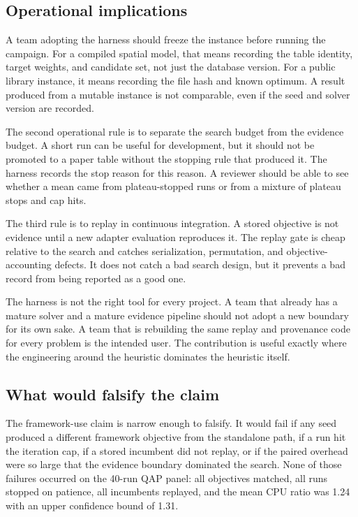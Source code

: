 \documentclass[pdflatex,sn-mathphys-num]{sn-jnl}
\begin{document}
\subsection{Operational implications}

A team adopting the harness should freeze the instance before running the campaign. For a compiled
spatial model, that means recording the table identity, target weights, and candidate set, not just
the database version. For a public library instance, it means recording the file hash and known
optimum. A result produced from a mutable instance is not comparable, even if the seed and solver
version are recorded.

The second operational rule is to separate the search budget from the evidence budget. A short run
can be useful for development, but it should not be promoted to a paper table without the stopping
rule that produced it. The harness records the stop reason for this reason. A reviewer should be able
to see whether a mean came from plateau-stopped runs or from a mixture of plateau stops and cap hits.

The third rule is to replay in continuous integration. A stored objective is not evidence until a
new adapter evaluation reproduces it. The replay gate is cheap relative to the search and catches
serialization, permutation, and objective-accounting defects. It does not catch a bad search design,
but it prevents a bad record from being reported as a good one.

The harness is not the right tool for every project. A team that already has a mature solver and a
mature evidence pipeline should not adopt a new boundary for its own sake. A team that is rebuilding
the same replay and provenance code for every problem is the intended user. The contribution is
useful exactly where the engineering around the heuristic dominates the heuristic itself.

\subsection{What would falsify the claim}

The framework-use claim is narrow enough to falsify. It would fail if any seed produced a different
framework objective from the standalone path, if a run hit the iteration cap, if a stored incumbent
did not replay, or if the paired overhead were so large that the evidence boundary dominated the
search. None of those failures occurred on the 40-run QAP panel: all objectives matched, all runs
stopped on patience, all incumbents replayed, and the mean CPU ratio was 1.24 with an upper
confidence bound of 1.31.
\end{document}
